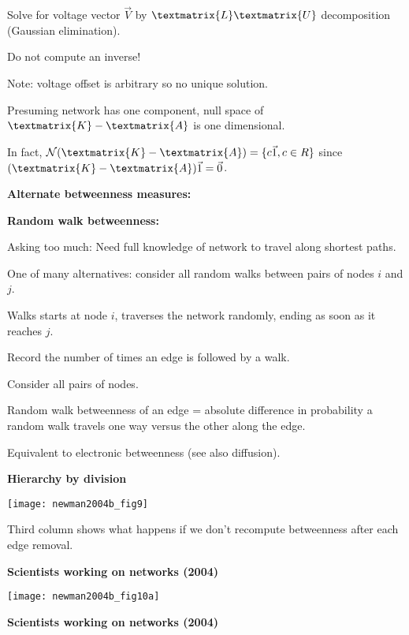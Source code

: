     Solve for voltage vector $\vec{V}$ 
    by \alert{$\textmatrix{L}\textmatrix{U}$ decomposition}
    (Gaussian elimination).
  
    Do not compute an inverse!
  
    \alert{Note:} 
    voltage offset is arbitrary
    so no unique solution.
  
    Presuming network has one component,
    null space of $\textmatrix{K} - \textmatrix{A}$ is one dimensional.
  
    In fact,
    $\mathcal{N}(\textmatrix{K} - \textmatrix{A}) = \{ c \vec{1}, c \in R \}$ since
    $(\textmatrix{K} - \textmatrix{A}) \vec{1} = \vec{0}$.
  



  \textbf{Alternate betweenness measures:}

  \textbf{Random walk betweenness:}
    
    
      \alert{Asking too much:} Need full knowledge of network to 
      travel along shortest paths.
    
      One of many alternatives: consider all \alert{random walks}
      between pairs of nodes $i$ and $j$.
    
      Walks starts at node $i$, traverses the network randomly,
      ending as soon as it reaches $j$.  
    
      Record the number of times an edge is followed by a walk.
    
      Consider all pairs of nodes.
    
      Random walk betweenness of an edge = 
      absolute difference in probability a random walk
      travels one way versus the other along the edge.
    
      Equivalent to electronic betweenness (see also diffusion).
    
  


  \textbf{Hierarchy by division}

  \texttt{[image: newman2004b\_fig9]}

  
   
    Third column shows what happens if
    we don't recompute betweenness after
    each edge removal.
  



  \textbf{Scientists working on networks (2004)}

  \texttt{[image: newman2004b\_fig10a]}


  \textbf{Scientists working on networks (2004)}


